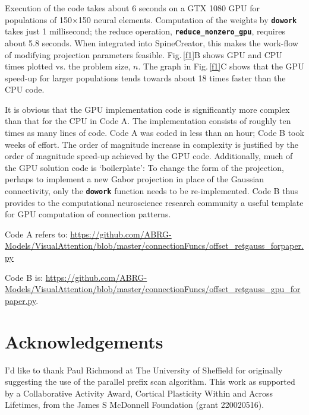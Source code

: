 \documentclass[12pt, a4paper]{article}
\makeatletter
\newcommand{\code}[1]{\textbf{\texttt{#1}}}
\DeclareRobustCommand{\selectlanguage}[1]{%
  \@ifundefined{alias@\string#1}
    {\ORIGselectlanguage{#1}}
    {\begingroup\edef\x{\endgroup
       \noexpand\ORIGselectlanguage{\@nameuse{alias@#1}}}\x}%
}
\makeatother
\begin{document}
Execution of the code takes about 6 seconds on a GTX 1080 GPU for populations
of 150$\times$150 neural elements.  Computation of the weights
by \code{dowork} takes just 1 millisecond; the reduce
operation, \code{reduce\_nonzero\_gpu}, requires about 5.8 seconds. When
integrated into SpineCreator, this makes the work-flow of modifying projection
parameters feasible. Fig.\,\ref{f1}B shows GPU and CPU times plotted vs. the
problem size, $n$. The graph in Fig.\,\ref{f1}C shows that the GPU speed-up
for larger populations tends towards about 18 times faster than the CPU code.

It is obvious that the GPU implementation code is significantly more complex
than that for the CPU in Code A. The implementation consists of roughly
ten times as many lines of code. Code A was coded in less than an hour;
Code B took weeks of effort. The order of magnitude increase in complexity
is justified by the order of magnitude speed-up achieved by the GPU code.
%
Additionally, much of the GPU solution code is `boilerplate': To change the
form of the projection, perhaps to implement a new Gabor projection in place
of the Gaussian connectivity, only the \code{dowork} function needs to be
re-implemented. Code B thus provides to the computational neuroscience
research community a useful template for GPU computation of connection
patterns.
%

Code A refers
to: \url{https://github.com/ABRG-Models/VisualAttention/blob/master/connectionFuncs/offset_retgauss_forpaper.py}

Code B is: \url{https://github.com/ABRG-Models/VisualAttention/blob/master/connectionFuncs/offset_retgauss_gpu_forpaper.py}.

\section*{Acknowledgements}
I'd like to thank Paul Richmond at The University of Sheffield for originally
suggesting the use of the parallel prefix scan algorithm. This work as
supported by a Collaborative Activity Award, Cortical Plasticity Within and
Across Lifetimes, from the James S McDonnell Foundation (grant
220020516).

\selectlanguage{English}


\end{document}
